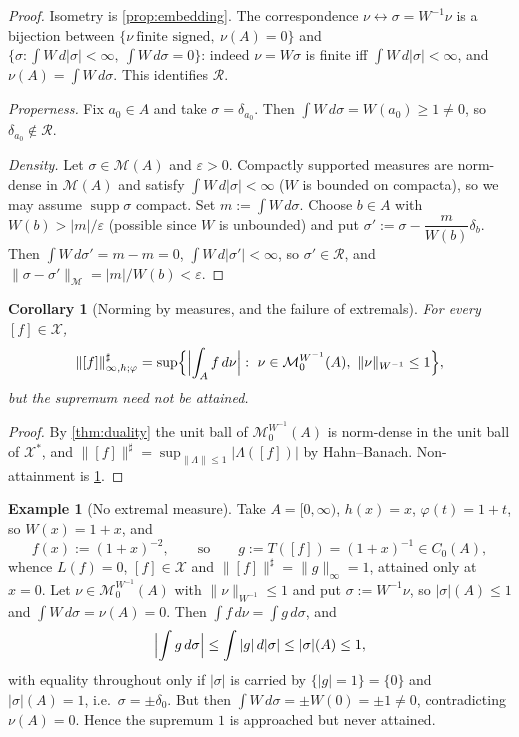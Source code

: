 \documentclass[11pt,a4paper]{article}
\numberwithin{equation}{section}
\theoremstyle{plain}
\newtheorem{corollary}[theorem]{Corollary}
\theoremstyle{definition}
\newtheorem{example}[theorem]{Example}
\theoremstyle{remark}
\newcommand{\Cz}{C_0}
\newcommand{\Msp}{\mathcal{M}}
\newcommand{\Xdec}{\mathcal{X}}
\DeclareMathOperator{\supp}{supp}
\begin{document}
\begin{proof}
Isometry is \cref{prop:embedding}. The correspondence $\nu\leftrightarrow\sigma=W^{-1}\nu$
is a bijection between $\{\nu\ \text{finite signed},\ \nu(A)=0\}$ and
$\{\sigma:\int W\,d|\sigma|<\infty,\ \int W\,d\sigma=0\}$: indeed $\nu=W\sigma$ is finite
iff $\int W\,d|\sigma|<\infty$, and $\nu(A)=\int W\,d\sigma$. This identifies
$\mathcal{R}$.

\emph{Properness.} Fix $a_0\in A$ and take $\sigma=\delta_{a_0}$. Then
$\int W\,d\sigma=W(a_0)\ge1\ne0$, so $\delta_{a_0}\notin\mathcal{R}$.

\emph{Density.} Let $\sigma\in\Msp(A)$ and $\varepsilon>0$. Compactly supported measures
are norm-dense in $\Msp(A)$ and satisfy $\int W\,d|\sigma|<\infty$ ($W$ is bounded on
compacta), so we may assume $\supp\sigma$ compact. Set $m:=\int W\,d\sigma$. Choose
$b\in A$ with $W(b)>|m|/\varepsilon$ (possible since $W$ is unbounded) and put
$\sigma':=\sigma-\dfrac{m}{W(b)}\delta_b$. Then $\int W\,d\sigma'=m-m=0$,
$\int W\,d|\sigma'|<\infty$, so $\sigma'\in\mathcal{R}$, and
$\|\sigma-\sigma'\|_{\Msp}=|m|/W(b)<\varepsilon$.
\end{proof}

\begin{corollary}[Norming by measures, and the failure of extremals]
\label{cor:norming}
For every $[f]\in\Xdec$,
\[
\|[f]\|^{\sharp}_{\infty,h;\varphi}
=\sup\Bigl\{\Bigl|\int_Af\,d\nu\Bigr|:\ \nu\in\Msp_0^{W^{-1}}(A),\ \|\nu\|_{W^{-1}}\le1\Bigr\},
\]
but the supremum need not be attained.
\end{corollary}

\begin{proof}
By \cref{thm:duality} the unit ball of $\Msp_0^{W^{-1}}(A)$ is norm-dense in the unit ball
of $\Xdec^{\ast}$, and $\|[f]\|^{\sharp}=\sup_{\|\Lambda\|\le1}|\Lambda([f])|$ by
Hahn--Banach. Non-attainment is \cref{ex:no-extremal}.
\end{proof}

\begin{example}[No extremal measure]\label{ex:no-extremal}
Take $A=[0,\infty)$, $h(x)=x$, $\varphi(t)=1+t$, so $W(x)=1+x$, and
\[
f(x):=(1+x)^{-2},\qquad\text{so}\qquad g:=T([f])=(1+x)^{-1}\in\Cz(A),
\]
whence $L(f)=0$, $[f]\in\Xdec$ and $\|[f]\|^{\sharp}=\|g\|_\infty=1$, attained only at
$x=0$. Let $\nu\in\Msp_0^{W^{-1}}(A)$ with $\|\nu\|_{W^{-1}}\le1$ and put
$\sigma:=W^{-1}\nu$, so $|\sigma|(A)\le1$ and $\int W\,d\sigma=\nu(A)=0$. Then
$\int f\,d\nu=\int g\,d\sigma$, and
\[
\Bigl|\int g\,d\sigma\Bigr|\le\int|g|\,d|\sigma|\le|\sigma|(A)\le1,
\]
with equality throughout only if $|\sigma|$ is carried by $\{|g|=1\}=\{0\}$ and
$|\sigma|(A)=1$, i.e.\ $\sigma=\pm\delta_0$. But then $\int W\,d\sigma=\pm W(0)=\pm1\ne0$,
contradicting $\nu(A)=0$. Hence the supremum $1$ is approached but never attained.
\end{example}
\end{document}

